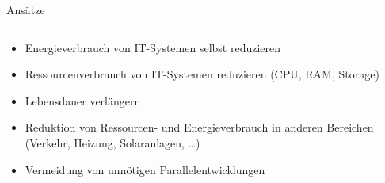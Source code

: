 \documentclass[t]{beamer}
\begin{document}
\begin{frame}{Ansätze}
    \begin{columns}
        \begin{column}{0.6\textwidth}
            \begin{itemize}
                \item Energieverbrauch von IT-Systemen selbst reduzieren
                \item Ressourcenverbrauch von IT-Systemen reduzieren
                    (CPU, RAM, Storage)
                \item<alert@2> Lebensdauer verlängern
                \item Reduktion von Ressourcen- und Energieverbrauch in
                    anderen Bereichen \\ (Verkehr, Heizung,
                    Solaranlagen, …)
                \item Vermeidung von unnötigen Parallelentwicklungen
            \end{itemize}
        \end{column}
        \begin{column}{0.4\textwidth}
        \end{column}
    \end{columns}
\end{frame}
\end{document}
